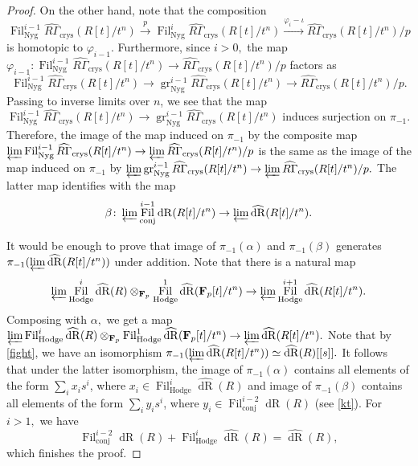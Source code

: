 \documentclass[10pt,letterpaper]{amsart}
\numberwithin{figure}{section}
\numberwithin{equation}{section}
\theoremstyle{definition}
\theoremstyle{definition}
\theoremstyle{definition}
\theoremstyle{definition}
\DeclareMathOperator{\gr}{gr}
\DeclareMathOperator{\conj}{conj}
\DeclareMathOperator{\Hodge}{Hodge}
\DeclareMathOperator{\Fil}{Fil}
\DeclareMathOperator{\dR}{dR}
\newcommand{\F}{\mathbf{F}}
\begin{document}
\begin{proof}
On the other hand, note that the composition $$\Fil^{i-1}_{\mathrm{Nyg}} \widehat{R\Gamma}_{\mathrm{crys}}(R[t]/t^n) \xrightarrow{p} \Fil_{\mathrm{Nyg}}^{i} \widehat{R\Gamma}_{\mathrm{crys}}(R[t]/t^n) \xrightarrow{\varphi_i - \iota} \widehat{R\Gamma}_{\mathrm{crys}}(R[t]/t^n)/p$$ is homotopic to $\varphi_{i-1}.$ Furthermore, since $i>0,$ the map $\varphi_{i-1}\colon\Fil^{i-1}_{\mathrm{Nyg}} \widehat{R\Gamma}_{\mathrm{crys}}(R[t]/t^n) \to \widehat{R\Gamma}_{\mathrm{crys}}(R[t]/t^n)/p $ factors as $$\Fil^{i-1}_{\mathrm{Nyg}} \widehat{R\Gamma}_{\mathrm{crys}}(R[t]/t^n) \to \gr^{i-1}_{\mathrm{Nyg}} \widehat{R\Gamma}_{\mathrm{crys}}(R[t]/t^n) \to \widehat{R\Gamma}_{\mathrm{crys}}(R[t]/t^n)/p .$$Passing to inverse limits over $n$, we see that the map $\Fil^{i-1}_{\mathrm{Nyg}} \widehat{R\Gamma}_{\mathrm{crys}}(R[t]/t^n) \to \gr^{i-1}_{\mathrm{Nyg}} \widehat{R\Gamma}_{\mathrm{crys}}(R[t]/t^n)$ induces surjection on $\pi_{-1}.$ Therefore, the image of the map induced on $\pi_{-1}$ by the composite map $\varprojlim \Fil^{i-1}_{\mathrm{Nyg}} \widehat{R\Gamma}_{\mathrm{crys}}(R[t]/t^n) \to \varprojlim \widehat{R\Gamma}_{\mathrm{crys}}(R[t]/t^n)/p$ is the same as the image of the map induced on $\pi_{-1}$ by $\varprojlim \gr^{i-1}_{\mathrm{Nyg}} \widehat{R\Gamma}_{\mathrm{crys}}(R[t]/t^n) \to \varprojlim \widehat{R\Gamma}_{\mathrm{crys}}(R[t]/t^n)/p.$ The latter map identifies with the map $$\beta\colon\varprojlim \Fil^{i-1}_{\conj} \mathrm{dR} (R[t]/t^n) \to \varprojlim \widehat{\dR} (R[t]/t^n).$$

It would be enough to prove that image of $\pi_{-1}(\alpha)$ and $\pi_{-1}(\beta)$ generates $\pi_{-1} (\varprojlim \widehat{\dR}(R[t]/t^n))$ under addition. Note that there is a natural map $$ \varprojlim \Fil^{i}_{\Hodge} \widehat{\dR}(R) \otimes_{\F_p} \Fil^1_{\Hodge}\widehat{\dR}(\F_p[t]/t^n) \to \varprojlim \Fil^{i+1}_{\mathrm{Hodge}} \widehat{\dR}(R[t]/t^n).$$Composing with $\alpha,$ we get a map $ \varprojlim \Fil^{i}_{\Hodge} \widehat{\dR}(R) \otimes_{\F_p} \Fil^1_{\Hodge}\widehat{\dR}(\F_p[t]/t^n) \to \varprojlim  \widehat{\dR}(R[t]/t^n).$ Note that by \cref{fight}, we have an isomorphism $\pi_{-1} (\varprojlim \widehat{\dR}(R[t]/t^n)) \simeq \widehat{\dR}(R)[[s]].$ It follows that under the latter isomorphism, the image of $\pi_{-1}(\alpha)$ contains all elements of the form $\sum_i x_i s^i$, where $x_i \in \Fil^i_{\Hodge} \widehat{\dR}(R)$ and image of $\pi_{-1}(\beta)$ contains all elements of the form $\sum_i y_i s^i$, where $y_i \in \Fil^{i-2}_{\conj}{\dR}(R)$ (see \cref{kt}). For $i >1,$ we have $$\Fil^{i-2}_{\conj}{\dR}(R) + \Fil^i_{\Hodge} \widehat{\dR}(R) = \widehat{\dR}(R),$$ which finishes the proof. 
\end{proof}{}
\end{document}
